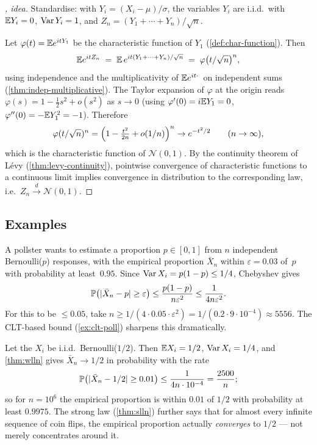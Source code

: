 \begin{proof}[, idea]
Standardise: with $Y_i = (X_i - \mu)/\sigma$, the variables $Y_i$ are
i.i.d.\ with $\mathbb{E} Y_i = 0$, $\operatorname{Var} Y_i = 1$, and
$Z_n = (Y_1 + \cdots + Y_n)/\sqrt{n}$.

Let $\varphi(t) = \mathbb{E} e^{itY_1}$ be the characteristic function of
$Y_1$ (\cref{def:char-function}). Then
\[
  \mathbb{E} e^{itZ_n} \;=\; \mathbb{E}\, e^{it(Y_1 + \cdots + Y_n)/\sqrt n} \;=\; \varphi\bigl(t/\sqrt n\bigr)^n,
\]
using independence and the multiplicativity of $\mathbb{E} e^{i t \cdot \,}$
on independent sums (\cref{thm:indep-multiplicative}). The Taylor
expansion of $\varphi$ at the origin reads
$\varphi(s) = 1 - \tfrac{1}{2} s^2 + o(s^2)$ as $s \to 0$ (using
$\varphi'(0) = i \mathbb{E} Y_1 = 0$, $\varphi''(0) = -\mathbb{E} Y_1^2 = -1$).
Therefore
\[
  \varphi(t/\sqrt n)^n = \Bigl(1 - \tfrac{t^2}{2n} + o(1/n)\Bigr)^n \to e^{-t^2/2} \qquad (n \to \infty),
\]
which is the characteristic function of $\mathcal{N}(0, 1)$. By the
continuity theorem of Lévy (\cref{thm:levy-continuity}), pointwise
convergence of characteristic functions to a continuous limit
implies convergence in distribution to the corresponding law,
i.e.\ $Z_n \xrightarrow{d} \mathcal{N}(0, 1)$.
\end{proof}

\subsection*{Examples}

\begin{example}
\label{ex:cheb-poll}
A pollster wants to estimate a proportion $p \in [0, 1]$ from
$n$ independent Bernoulli($p$) responses, with the empirical
proportion $\bar X_n$ within $\varepsilon = 0.03$ of~$p$ with
probability at least~$0.95$. Since
$\operatorname{Var} X_i = p(1-p) \leq 1/4$, Chebyshev gives
\[
  \mathbb{P}\bigl(|\bar X_n - p| \geq \varepsilon\bigr) \leq \frac{p(1-p)}{n \varepsilon^2} \leq \frac{1}{4 n \varepsilon^2}.
\]
For this to be $\leq 0.05$, take $n \geq 1 / (4 \cdot 0.05 \cdot \varepsilon^2) = 1/(0.2 \cdot 9 \cdot 10^{-4}) \approx 5556$.
The CLT-based bound (\cref{ex:clt-poll}) sharpens this dramatically.
\end{example}

\begin{example}
\label{ex:wlln-coin}
Let the $X_i$ be i.i.d.\ Bernoulli($1/2$). Then $\mathbb{E} X_i = 1/2$,
$\operatorname{Var} X_i = 1/4$, and \cref{thm:wlln} gives $\bar X_n \to 1/2$ in
probability with the rate
\[
  \mathbb{P}\bigl(|\bar X_n - 1/2| \geq 0.01\bigr) \leq \frac{1}{4 n \cdot 10^{-4}} = \frac{2500}{n};
\]
so for $n = 10^6$ the empirical proportion is within $0.01$ of
$1/2$ with probability at least $0.9975$. The strong law
(\cref{thm:slln}) further says that for almost every infinite
sequence of coin flips, the empirical proportion actually
\emph{converges} to $1/2$ — not merely concentrates around it.
\end{example}

